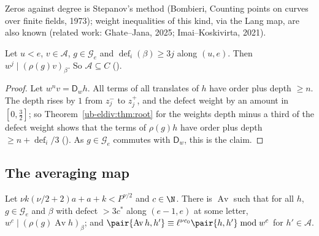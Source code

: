 Zeros against degree is Stepanov's method (Bombieri, Counting points on curves over finite fields,
1973); weight inequalities of this kind, via the Lang map, are also known (related work:
Ghate--Jana, 2025; Imai--Koskivirta, 2021).


\begin{corollary}
\label{ub-eldiv:cor:halfway}
Let $u<e$, $v\in\mathcal A$, $g\in\mathcal G_e$ and $\operatorname{def}_i(\beta)\ge3j$ along
$(u,e)$. Then $w^j\mid(\rho(g)v)_\beta$. So $\mathcal A\subseteq C$
().
\end{corollary}

\begin{proof}
Let $w^n v=\mathsf D_wh$. All terms of all translates of $h$ have order plus depth $\ge n$. The
depth rises by $1$ from $z^-_j$ to $z^+_j$, and the defect weight by an amount in $[0,\frac32]$; so
Theorem~\ref{ub-eldiv:thm:root} for the weights depth minus a third of the defect weight shows that
the terms of $\rho(g)h$ have order plus depth $\ge n+\operatorname{def}_i/3$
(). As $g\in\mathcal G_e$ commutes
with $\mathsf D_w$, this is the claim.
\end{proof}

\subsection{The averaging map}\label{ub-eldiv:sec:average}

\begin{theorem}
\label{ub-eldiv:thm:average}
Let $\nu k(\nu/2+2)a+a+k<P^{\nu/2}$ and $c\in\N$. There is $\operatorname{Av}$ such that for all
$h$, $g\in\mathcal G_e$ and $\beta$ with defect $>3c^*$ along $(e-1,e)$ at some letter,
$w^c\mid(\rho(g)\operatorname{Av}h)_\beta$; and $\pair{\operatorname{Av}h,h'}\equiv \ell^{\nu
c_0}\pair{h,h'}\bmod w^c$ for $h'\in\mathcal A$.
\end{theorem}

